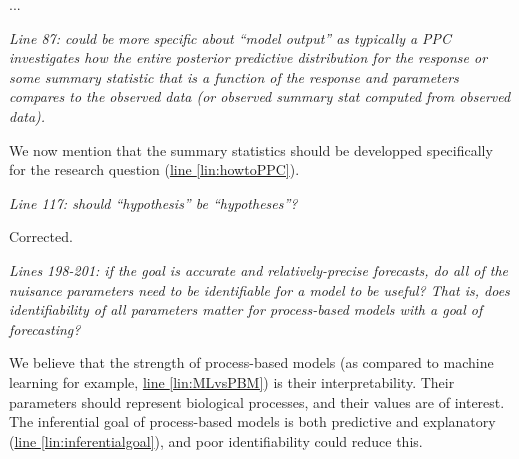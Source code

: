 \documentclass[11pt,letter]{article}
\begin{document}
...

\begin{mybox}
\emph{Line 87: could be more specific about “model output” as typically a PPC investigates how the entire posterior predictive distribution for the response or some summary statistic that is a function of the response and parameters compares to the observed data (or observed summary stat computed from observed data).}
\end{mybox}

We now mention that the summary statistics should be developped specifically for the research question (\href{file:forecastflows_r1\#lintarget:howtoPPC}{line \ref*{lin:howtoPPC}}). %

\begin{mybox}
\emph{Line 117: should “hypothesis” be “hypotheses”?}
\end{mybox}

Corrected.

\begin{mybox}
\emph{Lines 198-201: if the goal is accurate and relatively-precise forecasts, do all of the nuisance parameters need to be identifiable for a model to be useful? That is, does identifiability of all parameters matter for process-based models with a goal of forecasting?}
\end{mybox}

We believe that the strength of process-based models (as compared to machine learning for example, \href{file:forecastflows_r1\#lintarget:MLvsPBM}{line \ref*{lin:MLvsPBM}}) is their interpretability. Their parameters should represent biological processes, and their values are of interest. The inferential goal of process-based models is both predictive and explanatory (\href{file:forecastflows_r1\#lintarget:inferentialgoal}{line \ref*{lin:inferentialgoal}}), and poor identifiability could reduce this.

\clearpage

\end{document}
